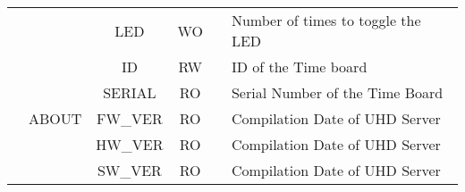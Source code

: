 \documentclass[11pt]{article}
\begin{document}
{\begin{landscape}
\begin{table}[H]
\begin{tabular}{|c|c|c|c|c|c|l|}
                       &                         & \multicolumn{2}{c|}{LED}           & WO                &             & Number of times to toggle the LED                                     \\ \cline{2-7} 
                       & \multirow{5}{*}{ABOUT}  & \multicolumn{2}{c|}{ID}            & RW                &             & ID of the Time board                                                  \\ \cline{3-7} 
                       &                         & \multicolumn{2}{c|}{SERIAL}        & RO                &             & Serial Number of the Time Board                                       \\ \cline{3-7} 
                       &                         & \multicolumn{2}{c|}{FW\_VER}       & RO                &             & Compilation Date of UHD Server                                        \\ \cline{3-7} 
                       &                         & \multicolumn{2}{c|}{HW\_VER}       & RO                &             & Compilation Date of UHD Server                                        \\ \cline{3-7} 
                       &                         & \multicolumn{2}{c|}{SW\_VER}       & RO                &             & Compilation Date of UHD Server                                        \\ \hline
\end{tabular}
\end{table}


\end{landscape}}
\end{document}
